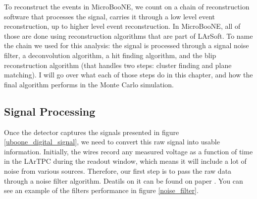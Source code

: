To reconstruct the events in MicroBooNE, we count on a chain of reconstruction software that processes the signal, carries it through a low level event reconstruction, up to higher level event reconstruction. In MicroBooNE, all of those are done using reconstruction algorithms that are part of LArSoft. To name the chain we used for this analysis: the signal is processed through a signal noise filter, a deconvolution algorithm, a hit finding algorithm, and the blip reconstruction algorithm (that handles two steps: cluster finding and plane matching). I will go over what each of those steps do in this chapter, and how the final algorithm performs in the Monte Carlo simulation.  

\subsection{Signal Processing}

Once the detector captures the signals presented in figure \ref{uboone_digital_signal}, we need to convert this raw signal into usable information. 
Initially, the wires record any measured voltage as a function of time in the LArTPC during the readout window, which means it will include a lot of noise from various sources. Therefore, our first step is to pass the raw data through a noise filter algorithm. Deatils on it can be found on paper \cite{noise_filter}. You can see an example of the filters performance in figure \ref{noise_filter}. 

